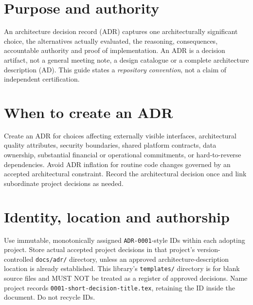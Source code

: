 \documentclass[11pt,letterpaper]{article}
\begin{document}
\makedoctocpage

\section{Purpose and authority}
An architecture decision record (ADR) captures one architecturally
significant choice, the alternatives actually evaluated, the reasoning,
consequences, accountable authority and proof of implementation. An ADR
is a decision artifact, not a general meeting note, a design catalogue or
a complete architecture description (AD). This guide states a
\emph{repository convention}, not a claim of independent certification.

\section{When to create an ADR}
Create an ADR for choices affecting externally visible interfaces,
architectural quality attributes, security boundaries, shared platform
contracts, data ownership, substantial financial or operational
commitments, or hard-to-reverse dependencies. Avoid ADR inflation for
routine code changes governed by an accepted architectural constraint.
Record the architectural decision once and link subordinate project
decisions as needed.

\section{Identity, location and authorship}
Use immutable, monotonically assigned \texttt{ADR-0001}-style IDs within
each adopting project. Store actual accepted project decisions in that
project's version-controlled \texttt{docs/adr/} directory, unless an
approved architecture-description location is already established.
This library's \texttt{templates/} directory is for blank source files
and MUST NOT be treated as a register of approved decisions.
Name project records \texttt{0001-short-decision-title.tex}, retaining
the ID inside the document. Do not recycle IDs.
\end{document}
